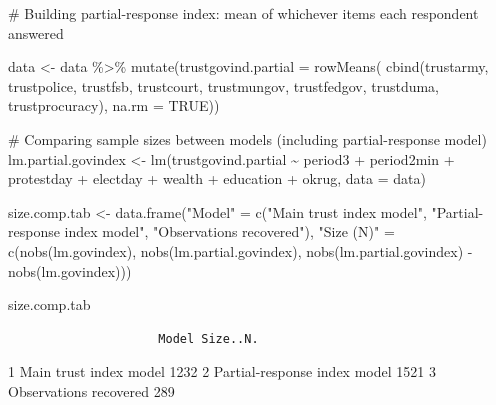\documentclass[
  letterpaper,
  DIV=11,
  numbers=noendperiod]{scrartcl}
\newenvironment{Shaded}{\begin{snugshade}}{\end{snugshade}}
\newcommand{\AttributeTok}[1]{\textcolor[rgb]{0.40,0.45,0.13}{#1}}
\newcommand{\CommentTok}[1]{\textcolor[rgb]{0.37,0.37,0.37}{#1}}
\newcommand{\ConstantTok}[1]{\textcolor[rgb]{0.56,0.35,0.01}{#1}}
\newcommand{\FunctionTok}[1]{\textcolor[rgb]{0.28,0.35,0.67}{#1}}
\newcommand{\NormalTok}[1]{\textcolor[rgb]{0.00,0.23,0.31}{#1}}
\newcommand{\OtherTok}[1]{\textcolor[rgb]{0.00,0.23,0.31}{#1}}
\newcommand{\SpecialCharTok}[1]{\textcolor[rgb]{0.37,0.37,0.37}{#1}}
\newcommand{\StringTok}[1]{\textcolor[rgb]{0.13,0.47,0.30}{#1}}
\begin{document}
\begin{Shaded}
\begin{Highlighting}[]
\CommentTok{\# Building partial{-}response index: mean of whichever items each respondent answered}

\NormalTok{data }\OtherTok{\textless{}{-}}\NormalTok{ data }\SpecialCharTok{\%\textgreater{}\%} 
  \FunctionTok{mutate}\NormalTok{(}\AttributeTok{trustgovind.partial =} \FunctionTok{rowMeans}\NormalTok{(}
    \FunctionTok{cbind}\NormalTok{(trustarmy, trustpolice, trustfsb, trustcourt,}
\NormalTok{          trustmungov, trustfedgov, trustduma, trustprocuracy),}
    \AttributeTok{na.rm =} \ConstantTok{TRUE}\NormalTok{))}

\CommentTok{\# Comparing sample sizes between models (including partial{-}response model)}
\NormalTok{lm.partial.govindex }\OtherTok{\textless{}{-}} \FunctionTok{lm}\NormalTok{(trustgovind.partial }\SpecialCharTok{\textasciitilde{}}\NormalTok{ period3 }\SpecialCharTok{+}\NormalTok{ period2min }\SpecialCharTok{+}\NormalTok{ protestday }\SpecialCharTok{+} 
\NormalTok{                            electday }\SpecialCharTok{+}\NormalTok{ wealth }\SpecialCharTok{+}\NormalTok{ education }\SpecialCharTok{+}\NormalTok{ okrug, }\AttributeTok{data =}\NormalTok{ data)}

\NormalTok{size.comp.tab }\OtherTok{\textless{}{-}} \FunctionTok{data.frame}\NormalTok{(}\StringTok{"Model"} \OtherTok{=} \FunctionTok{c}\NormalTok{(}\StringTok{"Main trust index model"}\NormalTok{, }
                                       \StringTok{"Partial{-}response index model"}\NormalTok{, }
                                       \StringTok{"Observations recovered"}\NormalTok{),}
                             \StringTok{"Size (N)"} \OtherTok{=} \FunctionTok{c}\NormalTok{(}\FunctionTok{nobs}\NormalTok{(lm.govindex), }
                                            \FunctionTok{nobs}\NormalTok{(lm.partial.govindex), }
                                            \FunctionTok{nobs}\NormalTok{(lm.partial.govindex) }\SpecialCharTok{{-}} \FunctionTok{nobs}\NormalTok{(lm.govindex)))}

\NormalTok{size.comp.tab}
\end{Highlighting}
\end{Shaded}

\begin{verbatim}
                     Model Size..N.
\end{verbatim}

1 Main trust index model 1232 2 Partial-response index model 1521 3
Observations recovered 289
\end{document}
